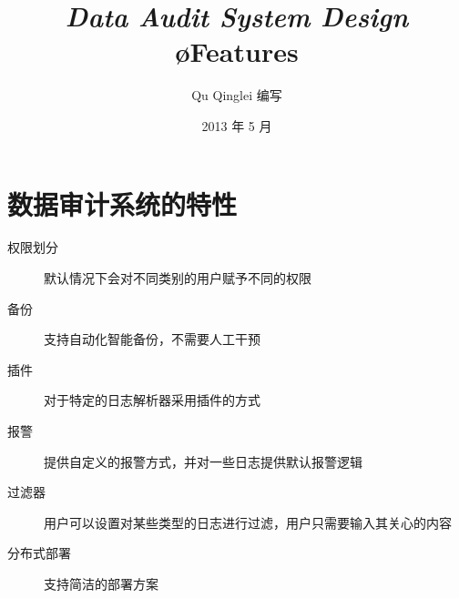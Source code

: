 \documentclass{article}
\begin{document}
\title{%
  {\huge \textit{Data Audit System Design}\\\smallskip}%
  {\LARGE \textsf{\o Features}}
}

\author{Qu Qinglei 编写 \\[3mm]
       }

\date{2013 年 5 月}

\maketitle

\begin{multicols}{2}
\tableofcontents
\end{multicols}


\section{数据审计系统的特性}
\begin{description}
\item[权限划分] 默认情况下会对不同类别的用户赋予不同的权限
\item[备份] 支持自动化智能备份，不需要人工干预
\item[插件] 对于特定的日志解析器采用插件的方式
\item[报警] 提供自定义的报警方式，并对一些日志提供默认报警逻辑
\item[过滤器] 用户可以设置对某些类型的日志进行过滤，用户只需要输入其关心的内容
\item[分布式部署] 支持简洁的部署方案
\end{description}
\end{document}
